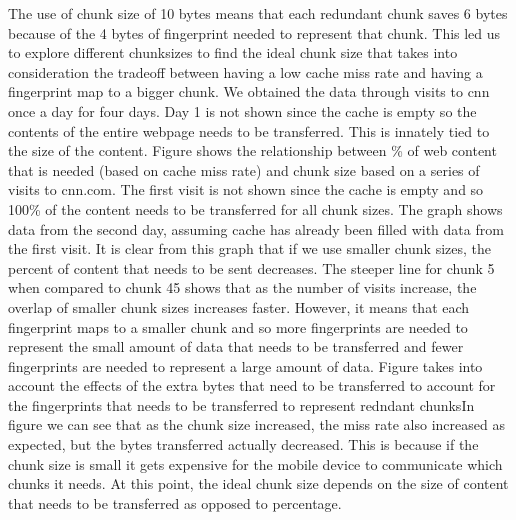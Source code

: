 The use of chunk size of 10 bytes means that each redundant chunk saves 6 bytes because of the 4 bytes of fingerprint needed to represent that chunk. 
This led us to explore different chunksizes to find the ideal chunk size that takes into consideration the tradeoff between having a low cache miss rate and having a fingerprint map to a bigger chunk.  We obtained the data through visits to cnn once a day for four days. Day 1 is not shown since the cache is empty so the contents of the entire webpage needs to be transferred.
This is innately tied to the size of the content. Figure shows the relationship between \% of web content that is needed (based on cache miss rate) and chunk size based on a series of visits to cnn.com. 
The first visit is not shown since the cache is empty and so 100\% of the content needs to be transferred for all chunk sizes. 
The graph shows data from the second day, assuming cache has already been filled with data from the first visit. 
It is clear from this graph that if we use smaller chunk sizes, the percent of content that needs to be sent decreases. 
The steeper line for chunk 5 when compared to chunk 45 shows that as the number of visits increase, the overlap of smaller chunk sizes increases faster.
However, it means that each fingerprint maps to a smaller chunk and so more fingerprints are needed to represent the small amount of data that needs to be transferred and fewer fingerprints are needed to represent a large amount of data. 
Figure takes into account the effects of the extra bytes that need to be transferred to account for the fingerprints that needs to be transferred to represent redndant chunksIn figure we can see that as the chunk size increased, the miss rate also increased as expected, but the bytes transferred actually decreased. 
This is because if the chunk size is small it gets expensive for the mobile device to communicate which chunks it needs. 
At this point, the ideal chunk size depends on the size of content that needs to be transferred as opposed to percentage.

